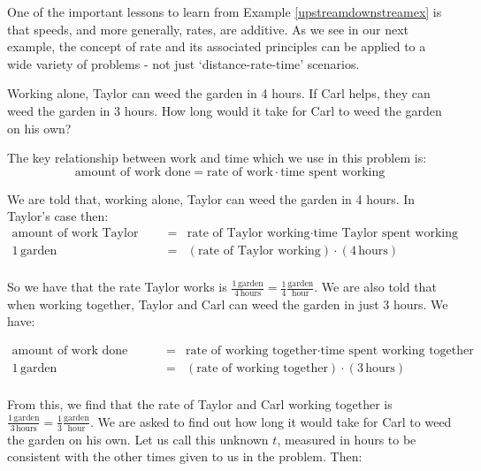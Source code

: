 \documentclass{ximera}
\begin{document}
One of the important lessons to learn from Example \ref{upstreamdownstreamex} is that speeds, and more generally, rates, are additive.  As we see in our next example, the concept of rate and its associated principles can be applied to a wide variety of problems - not just `distance-rate-time' scenarios.

\begin{example} \label{workex}  Working alone, Taylor can weed the garden in 4 hours.  If Carl helps, they can weed the garden in 3 hours.  How long would it take for Carl to weed the garden on his own?



\begin{explanation}  The key relationship between work and time which we use in this problem is: \[\text{amount of work done} = \text{rate of work} \cdot \text{time spent working} \]

We are told that, working alone, Taylor can weed the garden in 4 hours.  In Taylor's case then: \[ \begin{array}{rcl}

\text{amount of work Taylor does} & = & \text{rate of Taylor working} \cdot \text{time Taylor spent working} \\

1 \, \text{garden} & = & (\text{rate of Taylor working}) \cdot (4 \, \text{hours}) \\ \end{array} \]

So we have that the rate Taylor works is $\frac{1 \, \text{garden}}{ 4 \, \text{hours}} = \frac{1}{4} \frac{\text{garden}}{\text{hour}}$.    We are also told that when working together, Taylor and Carl can weed the garden in just 3 hours.  We have:

\[ \begin{array}{rcl}

\text{amount of work done together} & = & \text{rate of working together} \cdot \text{time spent working together} \\

1 \, \text{garden} & = & (\text{rate of working together}) \cdot (3 \, \text{hours}) \\ \end{array} \]

From this, we find that the rate of Taylor and Carl working together is $\frac{1 \, \text{garden}}{3 \, \text{hours}} = \frac{1}{3} \frac{\text{garden}}{\text{hour}}$.   We are asked to find out how long it would take for Carl to weed the garden on his own.  Let us call this unknown $t$, measured in hours to be consistent with the other times given to us in the problem. Then:


\end{explanation}
\end{example}
\end{document}
